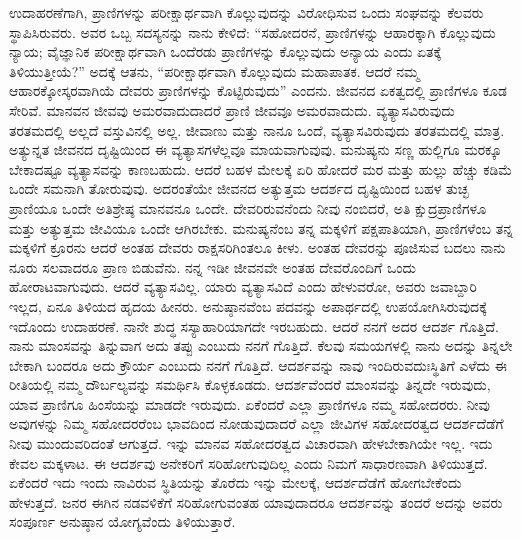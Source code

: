 \vskip 8pt

ಉದಾಹರಣೆಗಾಗಿ, ಪ್ರಾಣಿಗಳನ್ನು ಪರೀಕ್ಷಾರ್ಥವಾಗಿ ಕೊಲ್ಲುವುದನ್ನು ವಿರೋಧಿಸುವ ಒಂದು ಸಂಘವನ್ನು ಕೆಲವರು ಸ್ಥಾಪಿಸಿರುವರು. ಅವರ ಒಬ್ಬ ಸದಸ್ಯನನ್ನು ನಾನು ಕೇಳಿದೆ: “ಸಹೋದರನೆ, ಪ್ರಾಣಿಗಳನ್ನು ಆಹಾರಕ್ಕಾಗಿ ಕೊಲ್ಲುವುದು ನ್ಯಾಯ; ವೈಜ್ಞಾನಿಕ ಪರೀಕ್ಷಾರ್ಥವಾಗಿ ಒಂದೆರಡು ಪ್ರಾಣಿಗಳನ್ನು ಕೊಲ್ಲುವುದು ಅನ್ಯಾಯ ಎಂದು ಏತಕ್ಕೆ ತಿಳಿಯುತ್ತೀಯೆ?” ಅದಕ್ಕೆ ಆತನು, “ಪರೀಕ್ಷಾರ್ಥವಾಗಿ ಕೊಲ್ಲುವುದು ಮಹಾಪಾತಕ. ಆದರೆ ನಮ್ಮ ಆಹಾರಕ್ಕೋಸ್ಕರವಾಗಿಯೆ ದೇವರು ಪ್ರಾಣಿಗಳನ್ನು ಕೊಟ್ಟಿರುವುದು” ಎಂದನು. ಜೀವನದ ಏಕತ್ವದಲ್ಲಿ ಪ್ರಾಣಿಗಳೂ ಕೂಡ ಸೇರಿವೆ. ಮಾನವನ ಜೀವವು ಅಮರವಾದುದಾದರೆ ಪ್ರಾಣಿ ಜೀವವೂ ಅಮರವಾದುದು. ವ್ಯತ್ಯಾಸವಿರುವುದು ತರತಮದಲ್ಲಿ ಅಲ್ಲದೆ ವಸ್ತುವಿನಲ್ಲಿ ಅಲ್ಲ. ಜೀವಾಣು ಮತ್ತು ನಾನೂ ಒಂದೆ, ವ್ಯತ್ಯಾಸವಿರುವುದು ತರತಮದಲ್ಲಿ ಮಾತ್ರ. ಅತ್ಯುನ್ನತ ಜೀವನದ ದೃಷ್ಟಿಯಿಂದ ಈ ವ್ಯತ್ಯಾಸಗಳೆಲ್ಲವೂ ಮಾಯವಾಗುವುವು. ಮನುಷ್ಯನು ಸಣ್ಣ ಹುಲ್ಲಿಗೂ ಮರಕ್ಕೂ ಬೇಕಾದಷ್ಟೂ ವ್ಯತ್ಯಾಸವನ್ನು ಕಾಣಬಹುದು. ಆದರೆ ಬಹಳ ಮೇಲಕ್ಕೆ ಏರಿ ಹೋದರೆ ಮರ ಮತ್ತು ಹುಲ್ಲು ಹೆಚ್ಚು ಕಡಿಮೆ ಒಂದೇ ಸಮನಾಗಿ ತೋರುವುವು. ಅದರಂತೆಯೇ ಜೀವನದ ಅತ್ಯುತ್ತಮ ಆದರ್ಶದ ದೃಷ್ಟಿಯಿಂದ ಬಹಳ ತುಚ್ಛ ಪ್ರಾಣಿಯೂ ಒಂದೇ ಅತಿಶ್ರೇಷ್ಠ ಮಾನವನೂ ಒಂದೇ. ದೇವರಿರುವನೆಂದು ನೀವು ನಂಬಿದರೆ, ಅತಿ ಕ್ಷುದ್ರಪ್ರಾಣಿಗಳೂ ಮತ್ತು ಅತ್ಯುತ್ತಮ ಜೀವಿಯೂ ಒಂದೇ ಆಗಿರಬೇಕು. ಮನುಷ್ಯನೆಂಬ ತನ್ನ ಮಕ್ಕಳಿಗೆ ಪಕ್ಷಪಾತಿಯಾಗಿ, ಪ್ರಾಣಿಗಳೆಂಬ ತನ್ನ ಮಕ್ಕಳಿಗೆ ಕ್ರೂರನು ಆದರೆ ಅಂತಹ ದೇವರು ರಾಕ್ಷಸರಿಗಿಂತಲೂ ಕೀಳು. ಅಂತಹ ದೇವರನ್ನು ಪೂಜಿಸುವ ಬದಲು ನಾನು ನೂರು ಸಲವಾದರೂ ಪ್ರಾಣ ಬಿಡುವೆನು. ನನ್ನ ಇಡೀ ಜೀವನವೇ ಅಂತಹ ದೇವರೊಂದಿಗೆ ಒಂದು ಹೋರಾಟವಾಗುವುದು. ಆದರೆ ವ್ಯತ್ಯಾಸವಿಲ್ಲ. ಯಾರು ವ್ಯತ್ಯಾಸವಿದೆ ಎಂದು ಹೇಳುವರೋ, ಅವರು ಜವಾಬ್ದಾರಿ ಇಲ್ಲದ, ಏನೂ ತಿಳಿಯದ ಹೃದಯ ಹೀನರು. ಅನುಷ್ಠಾನವೆಂಬ ಪದವನ್ನು ಅಪಾರ್ಥದಲ್ಲಿ ಉಪಯೋಗಿಸಿರುವುದಕ್ಕೆ ಇದೊಂದು ಉದಾಹರಣೆ. ನಾನೇ ಶುದ್ಧ ಸಸ್ಯಾಹಾರಿಯಾಗದೇ ಇರಬಹುದು. ಆದರೆ ನನಗೆ ಅದರ ಆದರ್ಶ ಗೊತ್ತಿದೆ. ನಾನು ಮಾಂಸವನ್ನು ತಿನ್ನುವಾಗ ಅದು ತಪ್ಪು ಎಂಬುದು ನನಗೆ ಗೊತ್ತಿದೆ. ಕೆಲವು ಸಮಯಗಳಲ್ಲಿ ನಾನು ಅದನ್ನು ತಿನ್ನಲೇ ಬೇಕಾಗಿ ಬಂದರೂ ಅದು ಕ್ರೌರ್ಯ ಎಂಬುದು ನನಗೆ ಗೊತ್ತಿದೆ. ಆದರ್ಶವನ್ನು ನಾವು ಇಂದಿರುವದುಃಸ್ಥಿತಿಗೆ ಎಳೆದು ಈ ರೀತಿಯಲ್ಲಿ ನಮ್ಮ ದೌರ್ಬಲ್ಯವನ್ನು ಸಮರ್ಥಿಸಿ ಕೊಳ್ಳಕೂಡದು. ಆದರ್ಶವೆಂದರೆ ಮಾಂಸವನ್ನು ತಿನ್ನದೇ ಇರುವುದು, ಯಾವ ಪ್ರಾಣಿಗೂ ಹಿಂಸೆಯನ್ನು ಮಾಡದೇ ಇರುವುದು. ಏಕೆಂದರೆ ಎಲ್ಲಾ ಪ್ರಾಣಿಗಳೂ ನಮ್ಮ ಸಹೋದರರು. ನೀವು ಅವುಗಳನ್ನು ನಿಮ್ಮ ಸಹೋದರರೆಂಬ ಭಾವದಿಂದ ನೋಡುವುದಾದರೆ ಎಲ್ಲಾ ಜೀವಿಗಳ ಸಹೋದರತ್ವದ ಆದರ್ಶದೆಡೆಗೆ ನೀವು ಮುಂದುವರಿದಂತೆ ಆಗುತ್ತದೆ. ಇನ್ನು ಮಾನವ ಸಹೋದರತ್ವದ ವಿಚಾರವಾಗಿ ಹೇಳಬೇಕಾಗಿಯೇ ಇಲ್ಲ. ಇದು ಕೇವಲ ಮಕ್ಕಳಾಟ. ಈ ಆದರ್ಶವು ಅನೇಕರಿಗೆ ಸರಿಹೋಗುವುದಿಲ್ಲ ಎಂದು ನಿಮಗೆ ಸಾಧಾರಣವಾಗಿ ತಿಳಿಯುತ್ತದೆ. ಏಕೆಂದರೆ ಇದು ಇಂದು ನಾವಿರುವ ಸ್ಥಿತಿಯನ್ನು ತೊರೆದು ಇನ್ನು ಮೇಲಕ್ಕೆ, ಆದರ್ಶದೆಡೆಗೆ ಹೋಗಬೇಕೆಂದು ಹೇಳುತ್ತದೆ. ಜನರ ಈಗಿನ ನಡವಳಿಕೆಗೆ ಸರಿಹೋಗುವಂತಹ ಯಾವುದಾದರೂ ಆದರ್ಶವನ್ನು ತಂದರೆ ಅದನ್ನು ಅವರು ಸಂಪೂರ್ಣ ಅನುಷ್ಠಾನ ಯೋಗ್ಯವೆಂದು ತಿಳಿಯುತ್ತಾರೆ. 

\vskip 8pt

